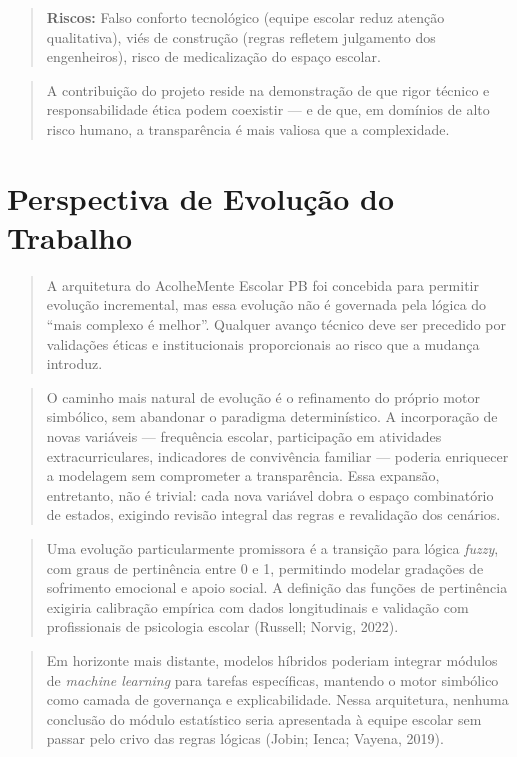 \documentclass[11pt]{article}
\begin{document}
\begin{quote}
\textbf{Riscos:} Falso conforto tecnológico (equipe escolar reduz
atenção qualitativa), viés de construção (regras refletem julgamento dos
engenheiros), risco de medicalização do espaço escolar.
\end{quote}

\begin{quote}
A contribuição do projeto reside na demonstração de que rigor técnico e
responsabilidade ética podem coexistir --- e de que, em domínios de alto
risco humano, a transparência é mais valiosa que a complexidade.
\end{quote}

    \section{Perspectiva de Evolução do
Trabalho}\label{perspectiva-de-evoluuxe7uxe3o-do-trabalho}

\begin{quote}
A arquitetura do AcolheMente Escolar PB foi concebida para permitir
evolução incremental, mas essa evolução não é governada pela lógica do
``mais complexo é melhor''. Qualquer avanço técnico deve ser precedido
por validações éticas e institucionais proporcionais ao risco que a
mudança introduz.
\end{quote}

\begin{quote}
O caminho mais natural de evolução é o refinamento do próprio motor
simbólico, sem abandonar o paradigma determinístico. A incorporação de
novas variáveis --- frequência escolar, participação em atividades
extracurriculares, indicadores de convivência familiar --- poderia
enriquecer a modelagem sem comprometer a transparência. Essa expansão,
entretanto, não é trivial: cada nova variável dobra o espaço
combinatório de estados, exigindo revisão integral das regras e
revalidação dos cenários.
\end{quote}

\begin{quote}
Uma evolução particularmente promissora é a transição para lógica
\emph{fuzzy}, com graus de pertinência entre 0 e 1, permitindo modelar
gradações de sofrimento emocional e apoio social. A definição das
funções de pertinência exigiria calibração empírica com dados
longitudinais e validação com profissionais de psicologia escolar
(Russell; Norvig, 2022).
\end{quote}

\begin{quote}
Em horizonte mais distante, modelos híbridos poderiam integrar módulos
de \emph{machine learning} para tarefas específicas, mantendo o motor
simbólico como camada de governança e explicabilidade. Nessa
arquitetura, nenhuma conclusão do módulo estatístico seria apresentada à
equipe escolar sem passar pelo crivo das regras lógicas (Jobin; Ienca;
Vayena, 2019).
\end{quote}
\end{document}
